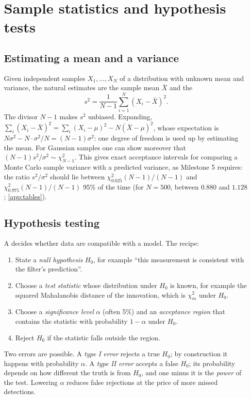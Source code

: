 \section{Sample statistics and hypothesis tests}

\subsection{Estimating a mean and a variance}

Given independent samples $X_1, \dots, X_N$ of a distribution with unknown mean and variance, the natural estimates are the sample mean
$\bar X$ and the 
\begin{equation}
  s^2 = \frac{1}{N - 1}\sum_{i=1}^N(X_i - \bar X)^2 .
\end{equation}
The divisor $N - 1$ makes $s^2$ unbiased. Expanding, $\sum_i(X_i - \bar X)^2 = \sum_i(X_i - \mu)^2 - N(\bar X - \mu)^2$, whose expectation is
$N\sigma^2 - N\cdot\sigma^2/N = (N - 1)\sigma^2$: one degree of freedom is used up by estimating the mean. For Gaussian samples one can show
moreover that $(N - 1)s^2/\sigma^2 \sim \chi^2_{N-1}$. This gives exact acceptance intervals for comparing a Monte Carlo sample variance with a
predicted variance, as Milestone 5 requires: the ratio $s^2/\sigma^2$ should lie between $\chi^2_{0.025}(N-1)/(N-1)$ and $\chi^2_{0.975}(N-1)/(N-1)$
95\% of the time (for $N = 500$, between $0.880$ and $1.128$; \cref{app:tables}).

\subsection{Hypothesis testing}

A  decides whether data are compatible with a model. The recipe:
\begin{enumerate}
  \item State a \emph{null hypothesis} $H_0$, for example ``this measurement is consistent with the filter's prediction''.
  \item Choose a \emph{test statistic} whose distribution under $H_0$ is known, for example the squared Mahalanobis distance of the
        innovation, which is $\chi^2_m$ under $H_0$.
  \item Choose a \emph{significance level} $\alpha$ (often 5\%) and an \emph{acceptance region} that contains the statistic with probability
        $1 - \alpha$ under $H_0$.
  \item Reject $H_0$ if the statistic falls outside the region.
\end{enumerate}
Two errors are possible. A \emph{type I error} rejects a true $H_0$; by construction it happens with probability $\alpha$. A \emph{type II
error} accepts a false $H_0$; its probability depends on how different the truth is from $H_0$, and one minus it is the \emph{power} of the
test. Lowering $\alpha$ reduces false rejections at the price of more missed detections.

